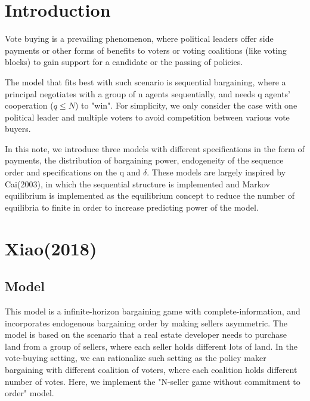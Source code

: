 \documentclass[ProjectGAZ]{subfiles}
\begin{document}



{\titlepagefinish}

\section{Introduction}\label{sec:intro}

Vote buying is a prevailing phenomenon, where political leaders offer side payments or other forms of benefits to voters or voting coalitions (like voting blocks) to gain support for a candidate or the passing of policies.

The model that fits best with such scenario is sequential bargaining, where a principal negotiates with a group of n agents sequentially, and needs q agents' cooperation ($q \leq N$) to "win". For simplicity, we only consider the case with one political leader and multiple voters to avoid competition between various vote buyers.

In this note, we introduce three models with different specifications in the form of payments, the distribution of bargaining power, endogeneity of the sequence order and specifications on the q and $\delta$. These models are largely inspired by Cai(2003), in which the sequential structure is implemented and Markov equilibrium is implemented as the equilibrium concept to reduce the number of equilibria to finite in order to increase predicting power of the model.


\section{Xiao(2018)}\label{subsec:Xiao}

\subsection{Model}\label{subsec:Xiao-Model}
This model is a infinite-horizon bargaining game with complete-information, and incorporates endogenous bargaining order by making sellers asymmetric. The model is based on the scenario that a real estate developer needs to purchase land from a group of sellers, where each seller holds different lots of land. In the vote-buying setting, we can rationalize such setting as the policy maker bargaining with different coalition of voters, where each coalition holds different number of votes. Here, we implement the "N-seller game without commitment to order" model.
\end{document}
